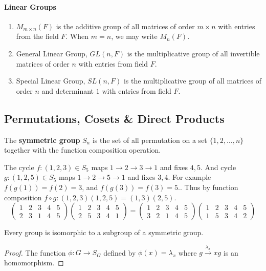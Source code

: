 \paragraph{Linear Groups}
\begin{enumerate}
	\item $M_{m \times n}(F)$ is the additive group of all matrices of order $m \times n$ with entries from the field $F$.
	When $m=n$, we may write $M_n(F)$.
	\item General Linear Group, $GL(n,F)$ is the multiplicative group of all invertible matrices of order $n$ with entries from field $F$.
	\item Special Linear Group, $SL(n,F)$ is the multiplicative group of all matrices of order $n$ and determinant $1$ with entries from field $F$.
\end{enumerate}

\subsection{Permutations, Cosets \& Direct Products}
\begin{definition}
	The \textbf{symmetric group} $S_n$ is the set of all permutation on a set $\{1,2,\dots,n\}$ together with the function composition operation.
\end{definition}

	The cycle $f: (1,2,3) \in S_5$ maps $1 \to 2 \to 3 \to 1$ and fixes $4,5$. And cycle $g:(1,2,5) \in S_5$ maps $1 \to 2 \to 5 \to 1$ and fixes $3,4$.
	For example $f(g(1)) = f(2) = 3$, and $f(g(3)) = f(3) = 5$..
	Thus by function composition $f \circ g : (1,2,3)(1,2,5) = (1,3)(2,5)$.
	$$ \begin{pmatrix} 1 & 2 & 3 & 4 & 5 \\ 2 & 3 & 1 & 4 & 5 \end{pmatrix} \begin{pmatrix} 1 & 2 & 3 & 4 & 5 \\ 2 & 5 & 3 & 4 & 1 \end{pmatrix} = \begin{pmatrix} 1 & 2 & 3 & 4 & 5 \\ 3 & 2 & 1 & 4 & 5 \end{pmatrix} \begin{pmatrix} 1 & 2 & 3 & 4 & 5 \\ 1 & 5 & 3 & 4 & 2 \end{pmatrix}$$

\begin{theorem}[Cayley]
	Every group is isomorphic to a subgroup of a symmetric group.
\end{theorem}
\begin{proof}
	The function $\phi : G \to S_G$ defined by $\phi(x) = \lambda_x$ where $g \overset{\lambda_x}{\to} xg$ is an homomorphism.
\end{proof}

